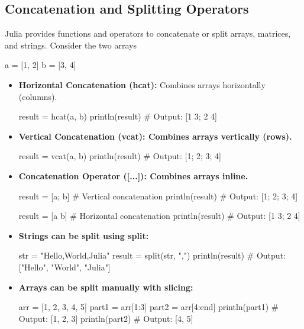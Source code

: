 \documentclass{report}
\begin{document}
    \subsection{Concatenation and Splitting Operators}
    \bigbreak \noindent 
    Julia provides functions and operators to concatenate or split arrays, matrices, and strings.
    \bigbreak \noindent 
    Consider the two arrays
    \bigbreak \noindent 
    \begin{jlcode}
        a = [1, 2]
        b = [3, 4]
    \end{jlcode}
    \begin{itemize}
        \item \textbf{Horizontal Concatenation (hcat):} Combines arrays horizontally (columns).
            \bigbreak \noindent 
            \begin{jlcode}
                result = hcat(a, b)
                println(result)  # Output: [1 3; 2 4]
            \end{jlcode}
        \item \textbf{Vertical Concatenation (vcat): Combines arrays vertically (rows).}
            \bigbreak \noindent 
            \begin{jlcode}
                result = vcat(a, b)
                println(result)  # Output: [1; 2; 3; 4]
            \end{jlcode}
        \item \textbf{Concatenation Operator ([...]): Combines arrays inline.}
            \bigbreak \noindent 
            \begin{jlcode}
                result = [a; b]  # Vertical concatenation
                println(result)  # Output: [1; 2; 3; 4]

                result = [a b]  # Horizontal concatenation
                println(result)  # Output: [1 3; 2 4]
            \end{jlcode}
        \item \textbf{Strings can be split using split:}
            \bigbreak \noindent 
            \begin{jlcode}
                str = "Hello,World,Julia"
                result = split(str, ",")
                println(result)  # Output: ["Hello", "World", "Julia"]
            \end{jlcode}
        \item \textbf{Arrays can be split manually with slicing:}
            \bigbreak \noindent 
            \begin{jlcode}
                arr = [1, 2, 3, 4, 5]
                part1 = arr[1:3]
                part2 = arr[4:end]
                println(part1)  # Output: [1, 2, 3]
                println(part2)  # Output: [4, 5]
            \end{jlcode}
    \end{itemize}
\end{document}
